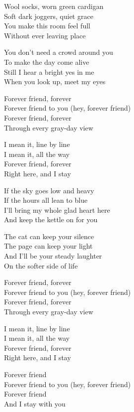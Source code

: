 \begin{lyrics}
Wool socks, worn green cardigan\\
Soft dark joggers, quiet grace\\
You make this room feel full\\
Without ever leaving place

You don't need a crowd around you\\
To make the day come alive\\
Still I hear a bright yes in me\\
When you look up, meet my eyes

Forever friend, forever\\
Forever friend to you
(hey, forever friend)\\
Forever friend, forever\\
Through every gray-day view

I mean it, line by line\\
I mean it, all the way\\
Forever friend, forever\\
Right here, and I stay

If the sky goes low and heavy\\
If the hours all lean to blue\\
I'll bring my whole glad heart here\\
And keep the kettle on for you

The cat can keep your silence\\
The page can keep your light\\
And I'll be your steady laughter\\
On the softer side of life

Forever friend, forever\\
Forever friend to you
(hey, forever friend)\\
Forever friend, forever\\
Through every gray-day view

I mean it, line by line\\
I mean it, all the way\\
Forever friend, forever\\
Right here, and I stay

Forever friend\\
Forever friend to you
(hey, forever friend)\\
Forever friend\\
And I stay with you
\end{lyrics}

